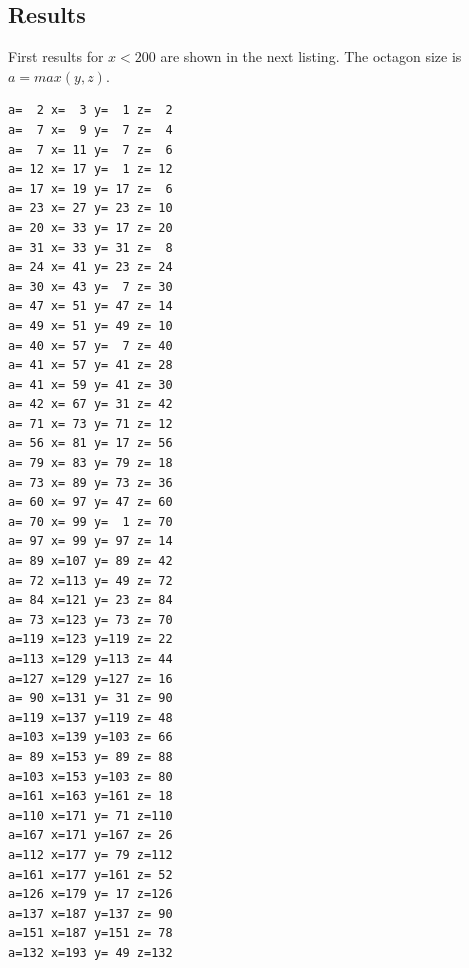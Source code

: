 \documentclass[11pt]{article}
\begin{document}
\subsection{Results}
First results for $x < 200$ are shown in the next listing.
The octagon size is $a = max(y,z)$.
\setlength{\columnsep}{100pt}
\begin{multicols}{2}
\begin{lstlisting}
a=  2 x=  3 y=  1 z=  2
a=  7 x=  9 y=  7 z=  4
a=  7 x= 11 y=  7 z=  6
a= 12 x= 17 y=  1 z= 12
a= 17 x= 19 y= 17 z=  6
a= 23 x= 27 y= 23 z= 10
a= 20 x= 33 y= 17 z= 20
a= 31 x= 33 y= 31 z=  8
a= 24 x= 41 y= 23 z= 24
a= 30 x= 43 y=  7 z= 30
a= 47 x= 51 y= 47 z= 14
a= 49 x= 51 y= 49 z= 10
a= 40 x= 57 y=  7 z= 40
a= 41 x= 57 y= 41 z= 28
a= 41 x= 59 y= 41 z= 30
a= 42 x= 67 y= 31 z= 42
a= 71 x= 73 y= 71 z= 12
a= 56 x= 81 y= 17 z= 56
a= 79 x= 83 y= 79 z= 18
a= 73 x= 89 y= 73 z= 36
a= 60 x= 97 y= 47 z= 60
a= 70 x= 99 y=  1 z= 70
a= 97 x= 99 y= 97 z= 14
a= 89 x=107 y= 89 z= 42
a= 72 x=113 y= 49 z= 72
a= 84 x=121 y= 23 z= 84
a= 73 x=123 y= 73 z= 70
a=119 x=123 y=119 z= 22
a=113 x=129 y=113 z= 44
a=127 x=129 y=127 z= 16
a= 90 x=131 y= 31 z= 90
a=119 x=137 y=119 z= 48
a=103 x=139 y=103 z= 66
a= 89 x=153 y= 89 z= 88
a=103 x=153 y=103 z= 80
a=161 x=163 y=161 z= 18
a=110 x=171 y= 71 z=110
a=167 x=171 y=167 z= 26
a=112 x=177 y= 79 z=112
a=161 x=177 y=161 z= 52
a=126 x=179 y= 17 z=126
a=137 x=187 y=137 z= 90
a=151 x=187 y=151 z= 78
a=132 x=193 y= 49 z=132
\end{lstlisting}
\end{multicols}

\newcommand{\fixer}[6] %
{
 \begin{scope}[shift={(#1*#6,0)}]
  \begin{scope}[rotate=90]
   \rod[000000]{#3}{#1}{#2}
   \begin{scope}[shift={(4*#1,0)},rotate=-143]
    \rod[0033FF]{5}{#1}{#2}
   \end{scope} 
   \begin{scope}[shift={(#1*#3,0)},rotate=-135+#5]
    \rod[FF3300]{#4}{#1}{#2}
   \end{scope} 
  \end{scope}
 \end{scope}
}
\end{document}
